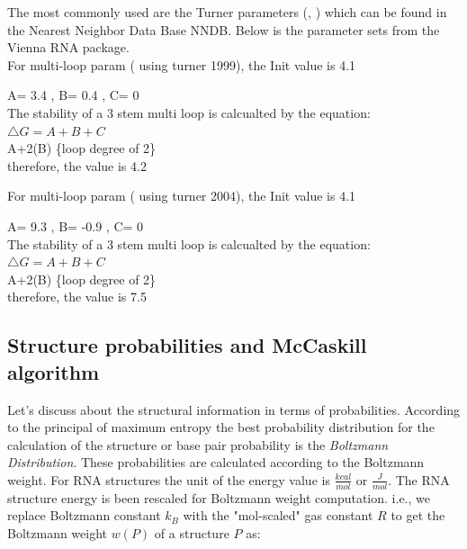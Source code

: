 \documentclass[twoside,a4paper]{report}
\numberwithin{equation}{section}
\begin{document}
 	 The most commonly used are the Turner parameters (\citep{mathews1999expanded}, \citep{mathews2004incorporating}) which can be found in the Nearest Neighbor Data Base NNDB. Below is the parameter sets from the Vienna RNA package.  \\
 	 
 	 For multi-loop param ( using turner 1999), the Init value is 4.1
 	 
 	 \begin{center}
 	 	A= 3.4 , B= 0.4 , C= 0\\
 	 	The stability of a 3 stem multi loop is calcualted by the equation:\\
 	 	$\triangle G = A+ B+ C $\\
 	 	A+2(B) \{loop degree of 2\}\\
 	 	therefore, the value is 4.2\\
 	 \end{center}
  
  For multi-loop param ( using turner 2004), the Init value is 4.1
  
  \begin{center}
  	A= 9.3 , B= -0.9 , C= 0\\
  	The stability of a 3 stem multi loop is calcualted by the equation:\\
  	$\triangle G = A+ B+ C  $\\
  	A+2(B) \{loop degree of 2\}\\
  	therefore, the value is 7.5\\
  \end{center}
 	 
 	 \subsection{Structure probabilities and McCaskill algorithm}
 	 Let's discuss about the structural information in terms of probabilities. According to the principal of maximum entropy \citep{jaynes1957information} the best probability distribution for the calculation of the structure or base pair probability is the \textit{Boltzmann Distribution}. These probabilities are calculated according to the Boltzmann weight. For RNA structures the unit of the energy value is $\frac{kcal}{mol}$ or $\frac{J}{mol}$. The RNA structure energy is been rescaled for Boltzmann weight computation. i.e., we replace Boltzmann constant $k_B$ with the "mol-scaled" gas constant $R$ to get the Boltzmann weight $w(P)$ of a structure $P$ as:\\
 	 
\end{document}
